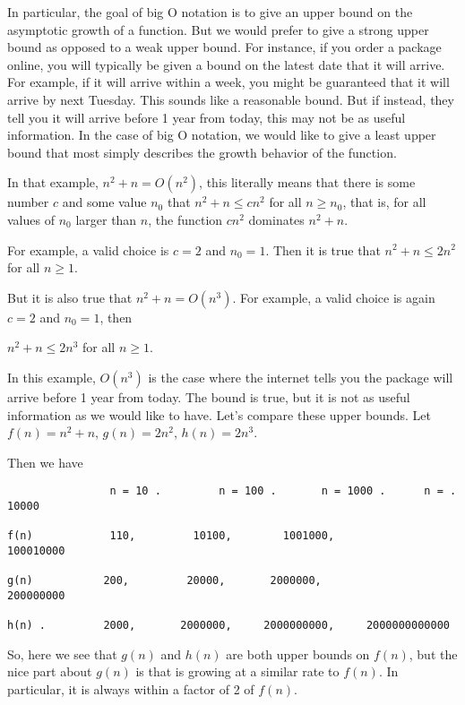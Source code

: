 In particular, the goal of big O notation is to give an upper bound on the asymptotic growth of a function.  
But we would prefer to give a strong upper bound as opposed to a weak upper bound.
For instance, if you order a package online, you will typically be given a bound on the latest date that it will arrive.  For example, if it will arrive within a week, you might be guaranteed that it will arrive by next Tuesday.  This sounds like a reasonable bound.  But if instead, they tell you it will arrive before 1 year from today, this may not be as useful information.
In the case of big O notation, we would like to give a least upper bound that most simply describes the growth behavior of the function.

In that example,  
$n^2 + n = O(n^2)$, this literally means that 
there is some number $c$ and some value $n_0$ that 
$n^2 + n \leq c n^2$ for all $n \geq n_0$, 
that is, for all values of $n_0$ larger than $n$, the function $c n^2$ dominates $n^2 + n$.  

For example, a valid choice is $c = 2$ and $n_0 = 1$.  Then it is true that 
$n^2 + n \leq 2 n^2$ for all $n \geq 1$.



But it is also true that $n^2 + n = O(n^3)$.  For example, a valid choice is again $c = 2$ and $n_0 = 1$, then 

$n^2 + n \leq 2 n^3$ for all $n \geq 1$.

In this example, $O(n^3)$ is the case where the internet tells you the package will arrive before 1 year from today.    The bound is true, but it is not as useful information as we would like to have.
Let's compare these upper bounds.  
Let $f(n) = n^2 + n$,
 $g(n) = 2n^2$,
$h(n) = 2n^3$.



Then we have
\begin{verbatim}
                n = 10 .         n = 100 .       n = 1000 .      n = .  10000

f(n)            110,         10100,        1001000,            100010000

g(n)           200,         20000,       2000000,              200000000

h(n) .         2000,       2000000,     2000000000,     2000000000000
\end{verbatim}


So, here we see that $g(n)$ and $h(n)$ are both upper bounds on $f(n)$, but the nice part about $g(n)$ is that is growing at a similar rate to $ f(n)$.  In particular, it is always within a factor of 2 of $f(n)$.  

